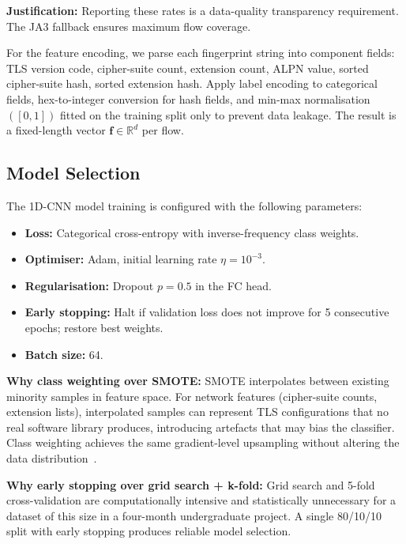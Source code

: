 \documentclass[12pt,a4paper]{report}
\begin{document}
\textbf{Justification:} Reporting these rates is a data-quality transparency requirement. The JA3 fallback ensures maximum flow coverage.

For the feature encoding, we parse each fingerprint string into component fields: TLS version code, cipher-suite count, extension count, ALPN value, sorted cipher-suite hash, sorted extension hash. Apply label encoding to categorical fields, hex-to-integer conversion for hash fields, and min-max normalisation $([0,1])$ fitted on the training split only to prevent data leakage. The result is a fixed-length vector $\mathbf{f} \in \mathbb{R}^d$ per flow.

\subsection{Model Selection}
The 1D-CNN model training is configured with the following parameters:
\begin{itemize}[leftmargin=*]
  \item \textbf{Loss:} Categorical cross-entropy with inverse-frequency class weights.
  \item \textbf{Optimiser:} Adam, initial learning rate $\eta = 10^{-3}$.
  \item \textbf{Regularisation:} Dropout $p = 0.5$ in the FC head.
  \item \textbf{Early stopping:} Halt if validation loss does not improve for 5 consecutive epochs; restore best weights.
  \item \textbf{Batch size:} 64.
\end{itemize}

\textbf{Why class weighting over SMOTE:} SMOTE interpolates between existing minority samples in feature space. For network features (cipher-suite counts, extension lists), interpolated samples can represent TLS configurations that no real software library produces, introducing artefacts that may bias the classifier. Class weighting achieves the same gradient-level upsampling without altering the data distribution~\cite{groupreweight2024}.

\textbf{Why early stopping over grid search + k-fold:} Grid search and 5-fold cross-validation are computationally intensive and statistically unnecessary for a dataset of this size in a four-month undergraduate project. A single 80/10/10 split with early stopping produces reliable model selection.
\end{document}
